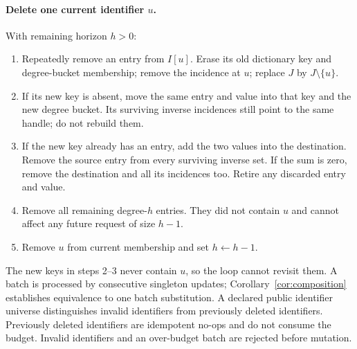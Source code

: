 \documentclass[11pt,a4paper]{article}
\theoremstyle{definition}\newtheorem{definition}[theorem]{Definition}
\newcommand{\minus}{\setminus}
\begin{document}
\paragraph{Delete one current identifier $u$.} With remaining horizon $h>0$:
\begin{enumerate}
\item Repeatedly remove an entry from $I[u]$. Erase its old dictionary key and degree-bucket membership; remove the incidence at $u$; replace $J$ by $J\minus\{u\}$.
\item If its new key is absent, move the same entry and value into that key and the new degree bucket. Its surviving inverse incidences still point to the same handle; do not rebuild them.
\item If the new key already has an entry, add the two values into the destination. Remove the source entry from every surviving inverse set. If the sum is zero, remove the destination and all its incidences too. Retire any discarded entry and value.
\item Remove all remaining degree-$h$ entries. They did not contain $u$ and cannot affect any future request of size $h-1$.
\item Remove $u$ from current membership and set $h\leftarrow h-1$.
\end{enumerate}
The new keys in steps 2--3 never contain $u$, so the loop cannot revisit them. A batch is processed by consecutive singleton updates; Corollary~\ref{cor:composition} establishes equivalence to one batch substitution. A declared public identifier universe distinguishes invalid identifiers from previously deleted identifiers. Previously deleted identifiers are idempotent no-ops and do not consume the budget. Invalid identifiers and an over-budget batch are rejected before mutation.
\end{document}
